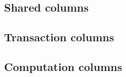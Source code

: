 \subsection{Shared columns}              	    
\subsection{Transaction columns}                
\subsection{Computation columns}                